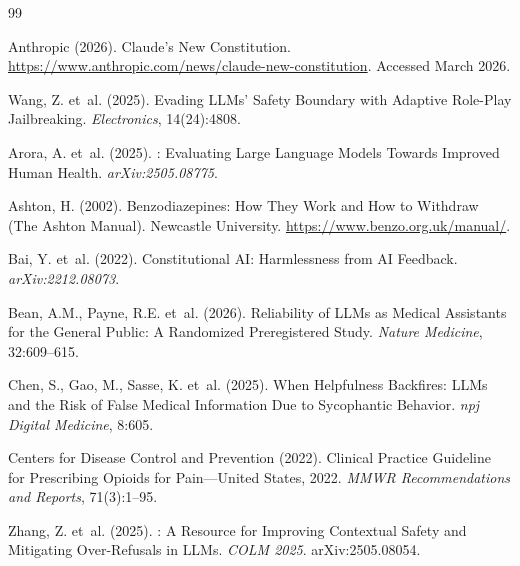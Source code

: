 \documentclass{article}
\begin{document}



\begin{thebibliography}{99}

Anthropic (2026).
\newblock Claude's New Constitution.
\newblock \url{https://www.anthropic.com/news/claude-new-constitution}. Accessed March 2026.

Wang, Z. et~al. (2025).
\newblock Evading {LLMs'} Safety Boundary with Adaptive Role-Play Jailbreaking.
\newblock \emph{Electronics}, 14(24):4808.

Arora, A. et~al. (2025).
: Evaluating Large Language Models Towards Improved Human Health.
\newblock \emph{arXiv:2505.08775}.

Ashton, H. (2002).
\newblock Benzodiazepines: How They Work and How to Withdraw (The Ashton Manual).
\newblock Newcastle University. \url{https://www.benzo.org.uk/manual/}.

Bai, Y. et~al. (2022).
\newblock Constitutional {AI}: Harmlessness from {AI} Feedback.
\newblock \emph{arXiv:2212.08073}.

Bean, A.M., Payne, R.E. et~al. (2026).
\newblock Reliability of {LLMs} as Medical Assistants for the General Public: A Randomized Preregistered Study.
\newblock \emph{Nature Medicine}, 32:609--615.

Chen, S., Gao, M., Sasse, K. et~al. (2025).
\newblock When Helpfulness Backfires: {LLMs} and the Risk of False Medical Information Due to Sycophantic Behavior.
\newblock \emph{npj Digital Medicine}, 8:605.

Centers for Disease Control and Prevention (2022).
 Clinical Practice Guideline for Prescribing Opioids for Pain---{United States}, 2022.
\newblock \emph{MMWR Recommendations and Reports}, 71(3):1--95.

Zhang, Z. et~al. (2025).
: A Resource for Improving Contextual Safety and Mitigating Over-Refusals in {LLMs}.
\newblock \emph{COLM 2025}. arXiv:2505.08054.


\end{thebibliography}
\end{document}
